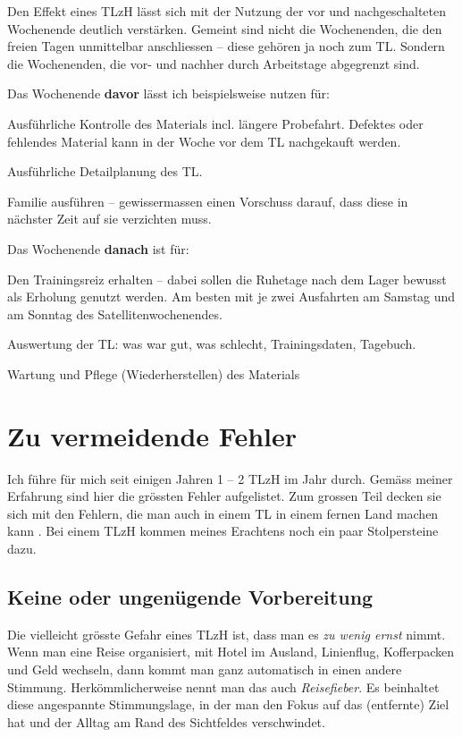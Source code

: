 \documentclass[a4paper,DIV13,BCOR0cm]{scrartcl}
\newcommand{\tlzh}{TLzH}
\begin{document}
Den Effekt eines \tlzh{} lässt sich mit der Nutzung der vor und nachgeschalteten Wochenende deutlich verstärken.
Gemeint sind nicht die Wochenenden, die den freien Tagen unmittelbar anschliessen -- diese gehören ja noch zum TL.
Sondern die Wochenenden, die vor- und nachher durch Arbeitstage abgegrenzt sind.

Das Wochenende \textbf{davor} lässt ich beispielsweise nutzen für:
\begin{itemize*}
  \item Ausführliche Kontrolle des Materials incl. längere Probefahrt.
    Defektes oder fehlendes Material kann in der Woche vor dem TL nachgekauft werden.
  \item Ausführliche Detailplanung des TL.
  \item Familie ausführen -- gewissermassen einen Vorschuss darauf, dass diese in nächster Zeit auf sie verzichten muss.
\end{itemize*}

Das Wochenende \textbf{danach} ist für:

\begin{itemize*}
  \item Den Trainingsreiz erhalten -- dabei sollen die Ruhetage nach dem Lager bewusst als Erholung genutzt werden.
    Am besten mit je zwei Ausfahrten am Samstag und am Sonntag des Satellitenwochenendes.
  \item Auswertung der TL: was war gut, was schlecht, Trainingsdaten, Tagebuch.
  \item Wartung und Pflege (Wiederherstellen) des Materials
\end{itemize*}


\section{Zu vermeidende Fehler}

Ich führe für mich seit einigen Jahren 1 -- 2 \tlzh{} im Jahr durch.
Gemäss meiner Erfahrung sind hier die grössten Fehler aufgelistet.
Zum grossen Teil decken sie sich mit den Fehlern, die man auch in einem TL in einem fernen Land machen kann \cite{Beck2016trainingslagersuenden}.
Bei einem \tlzh{} kommen meines Erachtens noch ein paar Stolpersteine dazu.

\subsection{Keine oder ungenügende Vorbereitung}

Die vielleicht grösste Gefahr eines \tlzh{} ist, dass man es \emph{zu wenig ernst} nimmt.
Wenn man eine Reise organisiert, mit Hotel im Ausland, Linienflug, Kofferpacken und Geld wechseln, 
dann kommt man ganz automatisch in einen andere Stimmung.
Herkömmlicherweise nennt man das auch \emph{Reisefieber}.
Es beinhaltet diese angespannte Stimmungslage, in der man den Fokus auf das (entfernte) Ziel hat und der Alltag am Rand des Sichtfeldes verschwindet.
\end{document}
